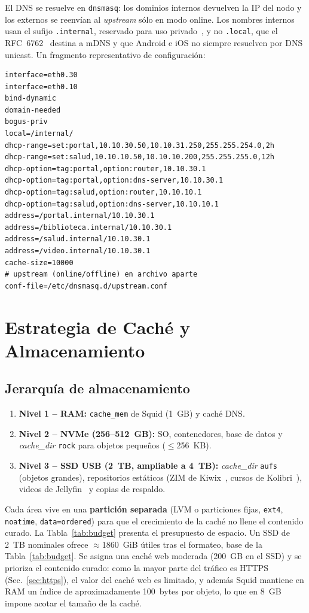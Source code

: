 \documentclass[conference]{IEEEtran}
\begin{document}
El DNS se resuelve en \texttt{dnsmasq}: los dominios internos devuelven la IP del nodo y los externos se reenvían al \textit{upstream} sólo en modo online. Los nombres internos usan el sufijo \texttt{.internal}, reservado para uso privado~\cite{internaltld}, y no \texttt{.local}, que el RFC~6762~\cite{rfc6762} destina a mDNS y que Android e iOS no siempre resuelven por DNS unicast. Un fragmento representativo de configuración:

\begin{lstlisting}
interface=eth0.30
interface=eth0.10
bind-dynamic
domain-needed
bogus-priv
local=/internal/
dhcp-range=set:portal,10.10.30.50,10.10.31.250,255.255.254.0,2h
dhcp-range=set:salud,10.10.10.50,10.10.10.200,255.255.255.0,12h
dhcp-option=tag:portal,option:router,10.10.30.1
dhcp-option=tag:portal,option:dns-server,10.10.30.1
dhcp-option=tag:salud,option:router,10.10.10.1
dhcp-option=tag:salud,option:dns-server,10.10.10.1
address=/portal.internal/10.10.30.1
address=/biblioteca.internal/10.10.30.1
address=/salud.internal/10.10.30.1
address=/video.internal/10.10.30.1
cache-size=10000
# upstream (online/offline) en archivo aparte
conf-file=/etc/dnsmasq.d/upstream.conf
\end{lstlisting}

\section{Estrategia de Caché y Almacenamiento}\label{sec:cache}

\subsection{Jerarquía de almacenamiento}
\begin{enumerate}
  \item \textbf{Nivel 1 -- RAM:} \texttt{cache\_mem} de Squid (1~GB) y caché DNS.
  \item \textbf{Nivel 2 -- NVMe (256--512~GB):} SO, contenedores, base de datos y \textit{cache\_dir} \texttt{rock} para objetos pequeños ($\le$256~KB).
  \item \textbf{Nivel 3 -- SSD USB (2~TB, ampliable a 4~TB):} \textit{cache\_dir} \texttt{aufs} (objetos grandes), repositorios estáticos (ZIM de Kiwix~\cite{kiwix}, cursos de Kolibri~\cite{kolibri}), videos de Jellyfin~\cite{jellyfin} y copias de respaldo.
\end{enumerate}

Cada área vive en una \textbf{partición separada} (LVM o particiones fijas, \texttt{ext4}, \texttt{noatime}, \texttt{data=ordered}) para que el crecimiento de la caché no llene el contenido curado. La Tabla~\ref{tab:budget} presenta el presupuesto de espacio. Un SSD de 2~TB nominales ofrece $\approx$1860~GiB útiles tras el formateo, base de la Tabla~\ref{tab:budget}. Se asigna una caché web moderada (200~GB en el SSD) y se prioriza el contenido curado: como la mayor parte del tráfico es HTTPS (Sec.~\ref{sec:https}), el valor del caché web es limitado, y además Squid mantiene en RAM un índice de aproximadamente 100~bytes por objeto, lo que en 8~GB impone acotar el tamaño de la caché.
\end{document}
